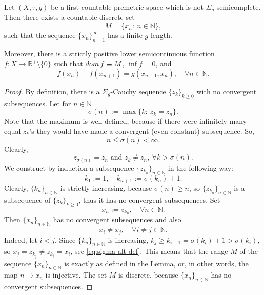 \documentclass[10pt,a4paper]{amsart}
\def\dom{\mathop{\rm dom}}
\newcommand{\N}{\mathbb{N}}
\begin{document}
\begin{lemma}
    \label{rem:1}
    Let  $(X,\tau,g)$ be a first countable premetric space which is not $\Sigma_g$-semicomplete. Then there exists a countable discrete set
    $$
        M = \{x_n:\ n\in\mathbb{N}\},
    $$
    such that the sequence $\{x_n\}_{n=1}^\infty$ has a finite $g$-length.

    Moreover, there is a strictly positive lower semicontinuous function $f:X\to\mathbb{R}^+\setminus\{0\}$ such that $\dom f \equiv M$, $\inf f = 0$, and
    \begin{equation}
        \label{eq:f-g-M-rel}
        f(x_n) - f(x_{n+1}) = g(x_{n+1},x_n), \quad\forall n\in\mathbb{N}.
    \end{equation}
\end{lemma}

\begin{proof}
    By definition, there is a $\Sigma_g$-Cauchy sequence $\{ z_k\}_{k\ge 0}$ with no convergent subsequences. Let for $n\in\mathbb{N}$
    $$
        \sigma(n) := \max \{k:\ z_k = z_n\}.
    $$
    Note that the maximum is well defined, because if there were infinitely many equal $z_k$'s they would have made a convergent (even constant) subsequence. So,
    $$
        n \le \sigma(n) < \infty.
    $$
    Clearly,
    \begin{equation}
        \label{eq:sigma-alt-def}
        z_{\sigma(n)} = z_n\text{ and }z_k\neq z_n,\ \forall k > \sigma(n).
    \end{equation}
    We construct by induction a subsequence $\{ z_{k_n}\}_{n\in\mathbb{N}}$ in the following way:
     $$
        k_1 := 1,\quad  k_{n+1} := \sigma(k_n) + 1.
    $$
    Clearly, $\{k_n\}_{n\in\N}$ is strictly increasing, because $\sigma(n)\ge n$, so $\{z_{k_n}\}_{n\in\N}$ is a subsequence of  $\{ z_k\}_{k\ge 0}$, thus it has no convergent subsequences. Set
    $$
        x_n := z_{k_n}, \quad\forall n\in\mathbb{N}.
    $$
    Then $\{x_n\}_{n\in\mathbb{N}}$ has no convergent subsequences and also
    $$
        x_i \neq x_j,\quad\forall i\neq j \in \mathbb{N}.
    $$
    Indeed, let $i < j$. Since $\{k_n\}_{n\in\N}$ is  increasing, $k_j \ge k_{i+1} =  \sigma (k_i) + 1 > \sigma (k_i)$, so $x_j = z_{k_j} \neq z_{k_i}=x_i$, see \eqref{eq:sigma-alt-def}. This means that the range $M$ of the sequence $\{x_n\}_{n\in\mathbb{N}}$ is exactly as defined in the Lemma, or, in other words, the map $n\to x_n$ is injective. The set $M$ is discrete, because  $\{x_n\}_{n\in\mathbb{N}}$ has no convergent subsequences.


\end{proof}
\end{document}
